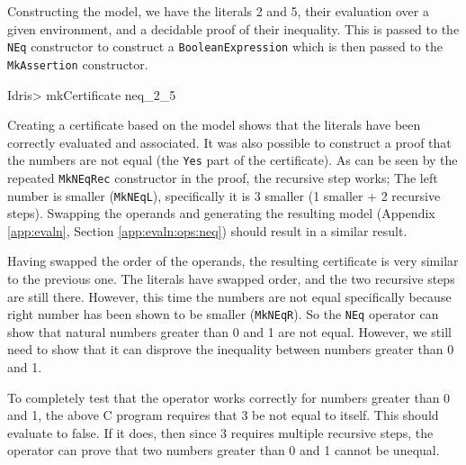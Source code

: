         Constructing the model, we have the literals 2 and 5, their evaluation over a given environment, and a decidable proof of their inequality. This is passed to the \texttt{NEq} constructor to construct a \texttt{BooleanExpression} which is then passed to the \texttt{MkAssertion} constructor.
        
        \begin{code}
Idris> mkCertificate neq_2_5
        \end{code}
        
        Creating a certificate based on the model shows that the literals have been correctly evaluated and associated. It was also possible to construct a proof that the numbers are not equal (the \texttt{Yes} part of the certificate). As can be seen by the repeated \texttt{MkNEqRec} constructor in the proof, the recursive step works; The left number is smaller (\texttt{MkNEqL}), specifically it is 3 smaller (1 smaller + 2 recursive steps). Swapping the operands and generating the resulting model (Appendix \ref{app:evaln}, Section \ref{app:evaln:ops:neq}) should result in a similar result.
        
        
        Having swapped the order of the operands, the resulting certificate is very similar to the previous one. The literals have swapped order, and the two recursive steps are still there. However, this time the numbers are not equal specifically because right number has been shown to be smaller (\texttt{MkNEqR}). So the \texttt{NEq} operator can show that natural numbers greater than 0 and 1 are not equal. However, we still need to show that it can disprove the inequality between numbers greater than 0 and 1.
        
        
        
        To completely test that the operator works correctly for numbers greater than 0 and 1, the above C program requires that 3 be not equal to itself. This should evaluate to false. If it does, then since 3 requires multiple recursive steps, the operator can prove that two numbers greater than 0 and 1 cannot be unequal.
        
        \newpage
        
        
